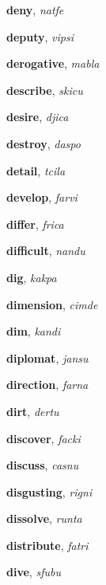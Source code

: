 \documentclass[12pt]{book}
\begin{document}
\begin{description}
\item[ ] \textbf{deny}, \textit{natfe}

\item[ ] \textbf{deputy}, \textit{vipsi}

\item[ ] \textbf{derogative}, \textit{mabla}

\item[ ] \textbf{describe}, \textit{skicu}

\item[ ] \textbf{desire}, \textit{djica}

\item[ ] \textbf{destroy}, \textit{daspo}

\item[ ] \textbf{detail}, \textit{tcila}

\item[ ] \textbf{develop}, \textit{farvi}

\item[ ] \textbf{differ}, \textit{frica}

\item[ ] \textbf{difficult}, \textit{nandu}

\item[ ] \textbf{dig}, \textit{kakpa}

\item[ ] \textbf{dimension}, \textit{cimde}

\item[ ] \textbf{dim}, \textit{kandi}

\item[ ] \textbf{diplomat}, \textit{jansu}

\item[ ] \textbf{direction}, \textit{farna}

\item[ ] \textbf{dirt}, \textit{dertu}

\item[ ] \textbf{discover}, \textit{facki}

\item[ ] \textbf{discuss}, \textit{casnu}

\item[ ] \textbf{disgusting}, \textit{rigni}

\item[ ] \textbf{dissolve}, \textit{runta}

\item[ ] \textbf{distribute}, \textit{fatri}

\item[ ] \textbf{dive}, \textit{sfubu}


\end{description}
\end{document}
